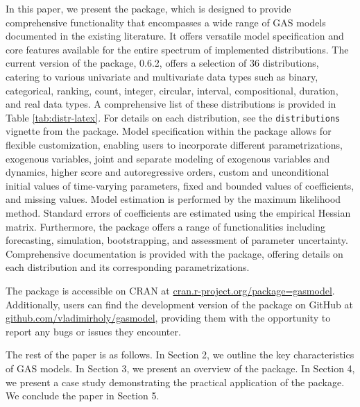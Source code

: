 In this paper, we present the  package, which is designed to provide comprehensive functionality that encompasses a wide range of GAS models documented in the existing literature. It offers versatile model specification and core features available for the entire spectrum of implemented distributions. The current version of the  package, 0.6.2, offers a selection of 36 distributions, catering to various univariate and multivariate data types such as binary, categorical, ranking, count, integer, circular, interval, compositional, duration, and real data types. A comprehensive list of these distributions is provided in Table \ref{tab:distr-latex}. For details on each distribution, see the \texttt{distributions} vignette from the  package. Model specification within the package allows for flexible customization, enabling users to incorporate different parametrizations, exogenous variables, joint and separate modeling of exogenous variables and dynamics, higher score and autoregressive orders, custom and unconditional initial values of time-varying parameters, fixed and bounded values of coefficients, and missing values. Model estimation is performed by the maximum likelihood method. Standard errors of coefficients are estimated using the empirical Hessian matrix. Furthermore, the package offers a range of functionalities including forecasting, simulation, bootstrapping, and assessment of parameter uncertainty. Comprehensive documentation is provided with the package, offering details on each distribution and its corresponding parametrizations.

The  package is accessible on CRAN at \href{https://cran.r-project.org/web/packages/gasmodel/index.html}{cran.r-project.org/package=gasmodel}. Additionally, users can find the development version of the package on GitHub at \href{https://github.com/vladimirholy/gasmodel}{github.com/vladimirholy/gasmodel}, providing them with the opportunity to report any bugs or issues they encounter.

The rest of the paper is as follows. In Section 2, we outline the key characteristics of GAS models. In Section 3, we present an overview of the  package. In Section 4, we present a case study demonstrating the practical application of the package. We conclude the paper in Section 5.

